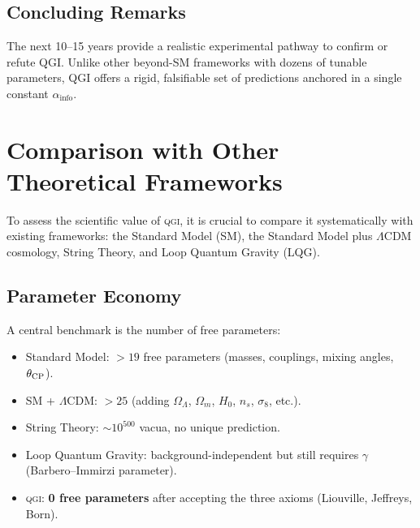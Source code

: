 \documentclass{article}
\numberwithin{equation}{section}
\theoremstyle{plain}
\theoremstyle{definition}
\theoremstyle{remark}
\newcommand{\ainfo}{\alpha_{\text{info}}}
\newcommand{\qgi}{\textsc{qgi}}
\begin{document}
\subsection{Concluding Remarks}
The next 10--15 years provide a realistic experimental pathway to confirm or refute QGI.  
Unlike other beyond-SM frameworks with dozens of tunable parameters, QGI offers a rigid, falsifiable set of predictions anchored in a single constant $\ainfo$.

\section{Comparison with Other Theoretical Frameworks}
\label{app:comparison}

To assess the scientific value of \qgi, it is crucial to compare it systematically with existing frameworks: the Standard Model (SM), the Standard Model plus $\Lambda$CDM cosmology, String Theory, and Loop Quantum Gravity (LQG).



\subsection{Parameter Economy}
A central benchmark is the number of free parameters:
\begin{itemize}
    \item Standard Model: $>19$ free parameters (masses, couplings, mixing angles, $\theta_{\rm CP}$).
    \item SM + $\Lambda$CDM: $>25$ (adding $\Omega_\Lambda$, $\Omega_m$, $H_0$, $n_s$, $\sigma_8$, etc.).
    \item String Theory: $\sim 10^{500}$ vacua, no unique prediction.
    \item Loop Quantum Gravity: background-independent but still requires $\gamma$ (Barbero--Immirzi parameter).
    \item \qgi: \textbf{0 free parameters} after accepting the three axioms (Liouville, Jeffreys, Born).
\end{itemize}
\end{document}
